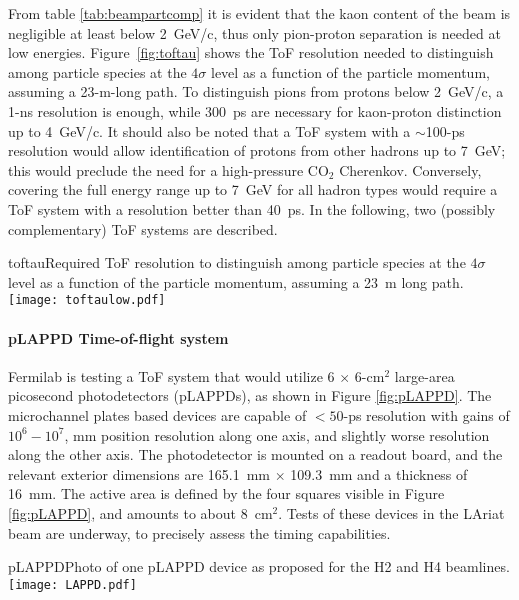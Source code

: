  From table \ref{tab:beampartcomp} it is evident that the kaon content of the beam is negligible at least below 2~GeV/c, thus  only pion-proton separation is needed at low energies. Figure~\ref{fig:toftau} shows the ToF resolution needed to distinguish among particle species at the $4\sigma$ level as a function of the particle momentum, assuming a 23-m-long path. To distinguish pions from protons below 2~GeV/c, a 1-ns resolution is enough, while 300~ps are necessary for kaon-proton distinction up to  4~GeV/c. It should also be noted that a ToF system with a $\sim$100-ps resolution would allow identification of protons from other hadrons up to 7~GeV; this would preclude the need for a %
  high-pressure CO$_2$ Cherenkov. %
  Conversely, covering %
  the full energy range up to 7~GeV for all hadron  types would require a ToF system with a resolution better than 40~ps. %
In the following, two (possibly complementary) ToF systems are described.
\begin{cdrfigure}{toftau}{Required ToF resolution to  distinguish among particle species at the $4\sigma$ level as a function of the particle momentum, assuming a 23~m long path. }
\texttt{[image: toftaulow.pdf]}
\end{cdrfigure}

\paragraph{pLAPPD Time-of-flight system}
Fermilab is testing a ToF system that would utilize %
6 $\times$ 6-cm$^2$
large-area picosecond photodetectors (pLAPPDs), as shown in Figure \ref{fig:pLAPPD}.
 The microchannel plates based devices
are capable of $< 50$-ps resolution with gains of $10^6-10^7$,
mm position resolution along one axis, and slightly worse resolution
along the other axis.  The photodetector is mounted on a readout
board, and the relevant exterior dimensions are 165.1~mm $\times$ 109.3~mm and a
thickness of 16~mm. The active area is defined by the four squares visible in Figure \ref{fig:pLAPPD}, and amounts to about 8~cm$^2$. Tests of these devices in the LAriat beam are underway, to precisely assess the timing capabilities. 
\begin{cdrfigure}[pLAPPD]{pLAPPD}{Photo of one pLAPPD device as proposed for the H2 and H4 beamlines.}
\texttt{[image: LAPPD.pdf]}
\end{cdrfigure}

